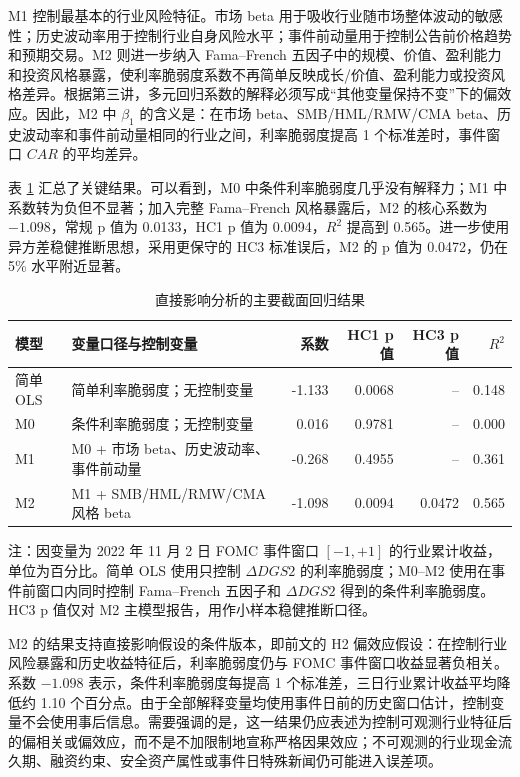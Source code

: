 \documentclass[UTF8,zihao=-4]{ctexart}
\begin{document}
M1 控制最基本的行业风险特征。市场 beta 用于吸收行业随市场整体波动的敏感性；历史波动率用于控制行业自身风险水平；事件前动量用于控制公告前价格趋势和预期交易。M2 则进一步纳入 Fama--French 五因子中的规模、价值、盈利能力和投资风格暴露，使利率脆弱度系数不再简单反映成长/价值、盈利能力或投资风格差异。根据第三讲，多元回归系数的解释必须写成``其他变量保持不变''下的偏效应。因此，M2 中 $\beta_1$ 的含义是：在市场 beta、SMB/HML/RMW/CMA beta、历史波动率和事件前动量相同的行业之间，利率脆弱度提高 1 个标准差时，事件窗口 $CAR$ 的平均差异。

表 \ref{tab:direct_main_results} 汇总了关键结果。可以看到，M0 中条件利率脆弱度几乎没有解释力；M1 中系数转为负但不显著；加入完整 Fama--French 风格暴露后，M2 的核心系数为 $-1.098$，常规 p 值为 0.0133，HC1 p 值为 0.0094，$R^2$ 提高到 0.565。进一步使用异方差稳健推断思想，采用更保守的 HC3 标准误后，M2 的 p 值为 0.0472，仍在 5\% 水平附近显著。

\begin{table}[H]
\centering
\caption{直接影响分析的主要截面回归结果}
\label{tab:direct_main_results}
\begin{threeparttable}
\begin{tabularx}{\textwidth}{p{}Xrrrr}
\toprule
模型 & 变量口径与控制变量 & 系数 & HC1 p 值 & HC3 p 值 & $R^2$ \\
\midrule
简单 OLS & 简单利率脆弱度；无控制变量 & -1.133 & 0.0068 & -- & 0.148 \\
M0 & 条件利率脆弱度；无控制变量 & 0.016 & 0.9781 & -- & 0.000 \\
M1 & M0 + 市场 beta、历史波动率、事件前动量 & -0.268 & 0.4955 & -- & 0.361 \\
M2 & M1 + SMB/HML/RMW/CMA 风格 beta & -1.098 & 0.0094 & 0.0472 & 0.565 \\
\bottomrule
\end{tabularx}
\begin{tablenotes}
\small
\item 注：因变量为 2022 年 11 月 2 日 FOMC 事件窗口 $[-1,+1]$ 的行业累计收益，单位为百分比。简单 OLS 使用只控制 $\Delta DGS2$ 的利率脆弱度；M0--M2 使用在事件前窗口内同时控制 Fama--French 五因子和 $\Delta DGS2$ 得到的条件利率脆弱度。HC3 p 值仅对 M2 主模型报告，用作小样本稳健推断口径。
\end{tablenotes}
\end{threeparttable}
\end{table}

M2 的结果支持直接影响假设的条件版本，即前文的 H2 偏效应假设：在控制行业风险暴露和历史收益特征后，利率脆弱度仍与 FOMC 事件窗口收益显著负相关。系数 $-1.098$ 表示，条件利率脆弱度每提高 1 个标准差，三日行业累计收益平均降低约 1.10 个百分点。由于全部解释变量均使用事件日前的历史窗口估计，控制变量不会使用事后信息。需要强调的是，这一结果仍应表述为控制可观测行业特征后的偏相关或偏效应，而不是不加限制地宣称严格因果效应；不可观测的行业现金流久期、融资约束、安全资产属性或事件日特殊新闻仍可能进入误差项。
\end{document}
